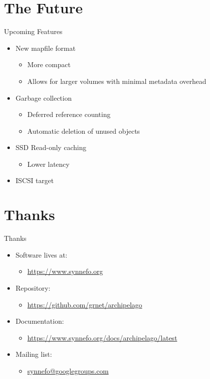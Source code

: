 \documentclass[utf8]{beamer}
\begin{document}
\section{The Future}

\begin{frame}{Upcoming Features}
  \begin{itemize}
    \item New mapfile format
      \begin{itemize}
      \item More compact
      \item Allows for larger volumes with minimal metadata overhead
      \end{itemize}
    \item Garbage collection
      \begin{itemize}
      \item Deferred reference counting
      \item Automatic deletion of unused objects
      \end{itemize}
    \item SSD Read-only caching
    \begin{itemize}
      \item Lower latency
    \end{itemize}
    \item ISCSI target
  \end{itemize}
\end{frame}

\section{Thanks}

\begin{frame}{Thanks}
 \begin{itemize}
  \item Software lives at:
    \begin{itemize}
      \item \url{https://www.synnefo.org}
    \end{itemize}
  \item Repository:
    \begin{itemize}
      \item \url{https://github.com/grnet/archipelago}
    \end{itemize}
  \item Documentation:
    \begin{itemize}
      \item \url{https://www.synnefo.org/docs/archipelago/latest}
    \end{itemize}
  \item Mailing list:
     \begin{itemize}
      \item \href{mailto:synnefo@googlegroups.con}{synnefo@googlegroups.com}
     \end{itemize}
  \end{itemize}
\end{frame}
\end{document}
